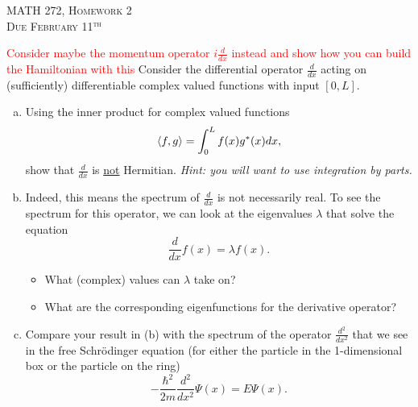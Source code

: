 \documentclass[12pt]{article} %
\begin{document}
\begin{center}
   \textsc{\large MATH 272, Homework 2}\\
   \textsc{Due February 11$^\textrm{th}$}
\end{center}
\vspace{.5cm}

\begin{problem}
   
\end{problem}

\begin{problem}

\end{problem}

\begin{problem}

\end{problem}

\begin{problem}

\end{problem}

\begin{problem}
\textcolor{red}{Consider maybe the momentum operator $i\frac{d}{dx}$ instead and show how you can build the Hamiltonian with this}
Consider the differential operator $\frac{d}{dx}$ acting on (sufficiently) differentiable complex valued functions with input $[0,L]$.  
\begin{enumerate}[(a)]
	\item Using the inner product for complex valued functions
	\[
	\left\langle f, g \right\rangle = \int_0^L f(x)g^*(x)dx,
	\]
	show that $\frac{d}{dx}$ is \underline{not} Hermitian. \emph{Hint: you will want to use integration by parts.}
	\item Indeed, this means the spectrum of $\frac{d}{dx}$ is not necessarily real.  To see the spectrum for this operator, we can look at the eigenvalues $\lambda$ that solve the equation
	\[
	\frac{d}{dx} f(x) = \lambda f(x).
	\]
	\begin{itemize}
		\item What (complex) values can $\lambda$ take on?
		\item What are the corresponding eigenfunctions for the derivative operator?
	\end{itemize}
	\item Compare your result in (b) with the spectrum of the operator $\frac{d^2}{dx^2}$ that we see in the free Schr\"odinger equation (for either the particle in the 1-dimensional box or the particle on the ring)
	\[
	-\frac{\hbar^2}{2m}\frac{d^2}{dx^2} \Psi(x) = E \Psi(x).
	\]
\end{enumerate}
\end{problem}
\end{document}
